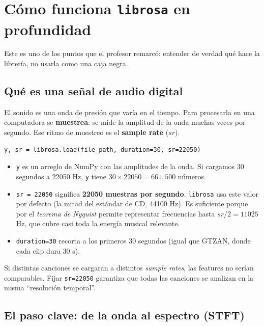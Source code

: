 \documentclass[11pt,a4paper]{article}
\newenvironment{ideabox}[1]{\begin{mdframed}[style=ideastyle,frametitle={#1}]}{\end{mdframed}}
\begin{document}
\section{Cómo funciona \texttt{librosa} en profundidad}

Este es uno de los puntos que el profesor remarcó: entender de verdad qué hace
la librería, no usarla como una caja negra.

\subsection{Qué es una señal de audio digital}

El sonido es una onda de presión que varía en el tiempo. Para procesarla en una
computadora se \textbf{muestrea}: se mide la amplitud de la onda muchas veces por
segundo. Ese ritmo de muestreo es el \textbf{sample rate} ($sr$).

\begin{lstlisting}
y, sr = librosa.load(file_path, duration=30, sr=22050)
\end{lstlisting}

\begin{itemize}[leftmargin=0.7cm]
  \item \texttt{y} es un arreglo de NumPy con las amplitudes de la onda. Si
  cargamos 30 segundos a 22050 Hz, \texttt{y} tiene
  $30 \times 22050 = 661{,}500$ números.
  \item \texttt{sr = 22050} significa \textbf{22050 muestras por segundo}.
  \texttt{librosa} usa este valor por defecto (la mitad del estándar de CD,
  44100 Hz). Es suficiente porque por el \emph{teorema de Nyquist} permite
  representar frecuencias hasta $sr/2 = 11025$ Hz, que cubre casi toda la
  energía musical relevante.
  \item \texttt{duration=30} recorta a los primeros 30 segundos (igual que
  GTZAN, donde cada clip dura 30 s).
\end{itemize}

\begin{ideabox}{¿Por qué fijar el sample rate?}
Si distintas canciones se cargaran a distintos \emph{sample rates}, las features
no serían comparables. Fijar \texttt{sr=22050} garantiza que todas las
canciones se analizan en la misma ``resolución temporal''.
\end{ideabox}

\subsection{El paso clave: de la onda al espectro (STFT)}
\end{document}
